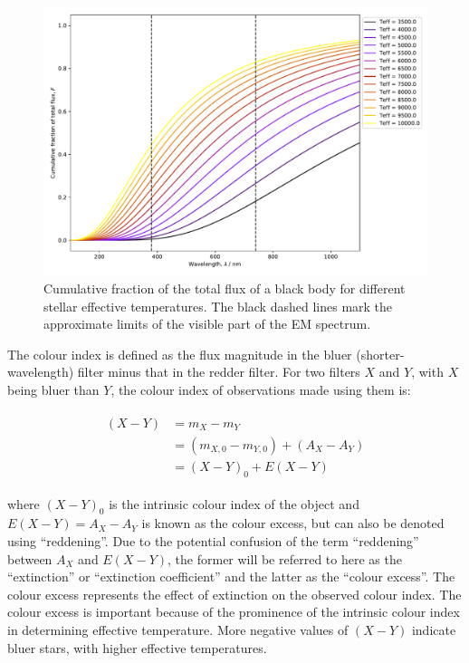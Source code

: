 \documentclass[12pt, a4paper]{report}
\begin{document}
\begin{figure}[h]
\begin{center}
\includegraphics[scale=0.5]{cumulative_blackbody_teff_illustration.pdf}
\caption{Cumulative fraction of the total flux of a black body for different stellar effective temperatures. The black dashed lines mark the approximate limits of the visible part of the EM spectrum.}
\label{cumulative_planck_curve}
\end{center}
\end{figure}

The colour index is defined as the flux magnitude in the bluer (shorter-wavelength) filter minus that in the redder filter. For two filters $X$ and $Y$, with $X$ being bluer than $Y$, the colour index of observations made using them is:

\begin{align}
\begin{split}
(X-Y) &= m_{X} - m_{Y} \\
&= (m_{X,0} - m_{Y,0}) + (A_{X} - A_{Y}) \\
&= (X-Y)_{0} + E(X-Y)
\end{split}
\end{align}

where $(X-Y)_{0}$ is the intrinsic colour index of the object and $E(X-Y) = A_{X} - A_{Y}$ is known as the colour excess, but can also be denoted using ``reddening''. Due to the potential confusion of the term ``reddening'' between $A_{X}$ and $E(X-Y)$, the former will be referred to here as the ``extinction'' or ``extinction coefficient'' and the latter as the ``colour excess''. The colour excess represents the effect of extinction on the observed colour index. The colour excess is important because of the prominence of the intrinsic colour index in determining effective temperature. More negative values of $(X-Y)$ indicate bluer stars, with higher effective temperatures.
\end{document}
